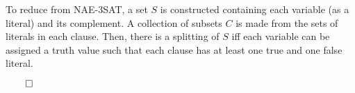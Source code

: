 \documentclass[12pt]{amsart}
\begin{document}
To reduce from NAE-3SAT, a set $S$ is constructed containing each variable (as a literal) and its complement. A collection of subsets $C$ is made from the sets of literals in each clause. Then, there is a splitting of $S$ iff each variable can be assigned a truth value such that each clause has at least one true and one false literal.

\hfill$\qed$
\end{document}
